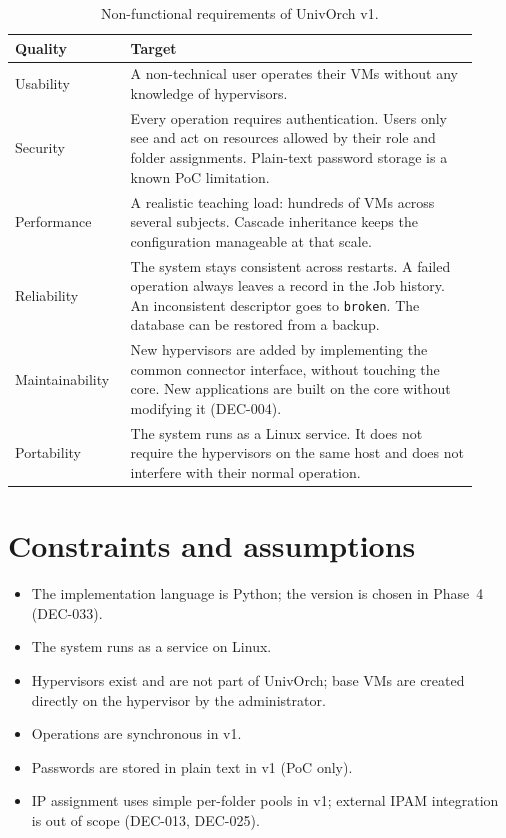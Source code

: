 \begin{table}[ht]
  \centering
  \small
  \begin{tabular}{p{0.22\linewidth} p{0.70\linewidth}}
    \toprule
    \textbf{Quality} & \textbf{Target} \\
    \midrule
    Usability     & A non-technical user operates their VMs without
                    any knowledge of hypervisors. \\
    Security      & Every operation requires authentication. Users
                    only see and act on resources allowed by their
                    role and folder assignments. Plain-text password
                    storage is a known PoC limitation. \\
    Performance   & A realistic teaching load: hundreds of VMs
                    across several subjects. Cascade inheritance
                    keeps the configuration manageable at that
                    scale. \\
    Reliability   & The system stays consistent across restarts. A
                    failed operation always leaves a record in the
                    Job history. An inconsistent descriptor goes to
                    \texttt{broken}. The database can be restored
                    from a backup. \\
    Maintainability & New hypervisors are added by implementing
                    the common connector interface, without touching
                    the core. New applications are built on the
                    core without modifying it (DEC-004). \\
    Portability   & The system runs as a Linux service. It does
                    not require the hypervisors on the same host
                    and does not interfere with their normal
                    operation. \\
    \bottomrule
  \end{tabular}
  \caption{Non-functional requirements of UnivOrch v1.}
  \label{tab:nfr-detail}
\end{table}

\section{Constraints and assumptions}

\begin{itemize}
  \item The implementation language is Python; the version is
        chosen in Phase~4 (DEC-033).
  \item The system runs as a service on Linux.
  \item Hypervisors exist and are not part of UnivOrch; base VMs
        are created directly on the hypervisor by the
        administrator.
  \item Operations are synchronous in v1.
  \item Passwords are stored in plain text in v1 (PoC only).
  \item IP assignment uses simple per-folder pools in v1; external
        IPAM integration is out of scope (DEC-013, DEC-025).
\end{itemize}


